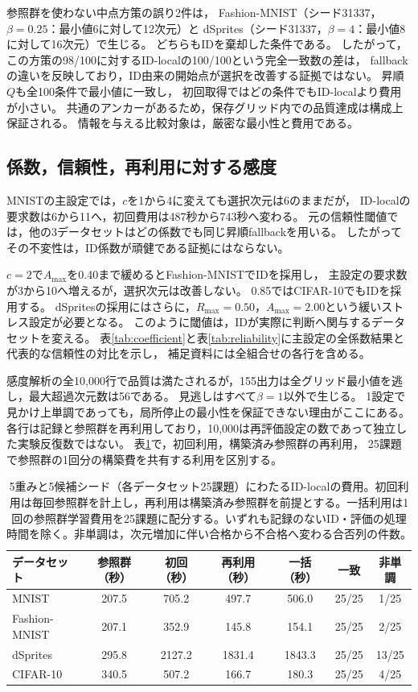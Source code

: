 \documentclass[11pt,a4paper]{ltjsarticle}
\begin{document}
参照群を使わない中点方策の誤り2件は，
Fashion-MNIST（シード31337，$\beta=0.25$：最小値6に対して12次元）と
dSprites（シード31337，$\beta=4$：最小値8に対して16次元）で生じる。
どちらもIDを棄却した条件である。
したがって，この方策の98/100に対するID-localの100/100という完全一致数の差は，
fallbackの違いを反映しており，ID由来の開始点が選択を改善する証拠ではない。
昇順$Q$も全100条件で最小値に一致し，
初回取得ではどの条件でもID-localより費用が小さい。
共通のアンカーがあるため，保存グリッド内での品質達成は構成上保証される。
情報を与える比較対象は，厳密な最小性と費用である。

\subsection{係数，信頼性，再利用に対する感度}\label{sec:idsensitivity}
MNISTの主設定では，$c$を1から4に変えても選択次元は6のままだが，
ID-localの要求数は6から11へ，初回費用は487秒から743秒へ変わる。
元の信頼性閾値では，他の3データセットはどの係数でも同じ昇順fallbackを用いる。
したがってその不変性は，ID係数が頑健である証拠にはならない。

$c=2$で$A_{\max}$を0.40まで緩めるとFashion-MNISTでIDを採用し，
主設定の要求数が3から10へ増えるが，選択次元は改善しない。
0.85ではCIFAR-10でもIDを採用する。
dSpritesの採用にはさらに，$R_{\max}=0.50$，$A_{\max}=2.00$という緩いストレス設定が必要となる。
このように閾値は，IDが実際に判断へ関与するデータセットを変える。
表\ref{tab:coefficient}と表\ref{tab:reliability}に主設定の全係数結果と代表的な信頼性の対比を示し，
補足資料には全組合せの各行を含める。

感度解析の全10,000行で品質は満たされるが，155出力は全グリッド最小値を逃し，最大超過次元数は56である。
見逃しはすべて$\beta=1$以外で生じる。
1設定で見かけ上単調であっても，局所停止の最小性を保証できない理由がここにある。
各行は記録と参照群を再利用しており，10,000は再評価設定の数であって独立した実験反復数ではない。
表\ref{tab:amortization}で，初回利用，構築済み参照群の再利用，
25課題で参照群の1回分の構築費を共有する利用を区別する。
\begin{table}[H]
\caption{5重みと5候補シード（各データセット25課題）にわたるID-localの費用。初回利用は毎回参照群を計上し，再利用は構築済み参照群を前提とする。一括利用は1回の参照群学習費用を25課題に配分する。いずれも記録のないID・評価の処理時間を除く。非単調は，次元増加に伴い合格から不合格へ変わる合否列の件数。}\label{tab:amortization}
\small
\setlength{\tabcolsep}{3pt}
\begin{tabular*}{\textwidth}{@{\extracolsep{\fill}}lcccccc@{}}
\toprule
データセット & 参照群（秒） & 初回（秒） & 再利用（秒） & 一括（秒） & 一致 & 非単調 \\
\midrule
MNIST & 207.5 & 705.2 & 497.7 & 506.0 & 25/25 & 1/25 \\
Fashion-MNIST & 207.1 & 352.9 & 145.8 & 154.1 & 25/25 & 2/25 \\
dSprites & 295.8 & 2127.2 & 1831.4 & 1843.3 & 25/25 & 13/25 \\
CIFAR-10 & 340.5 & 507.2 & 166.7 & 180.3 & 25/25 & 4/25 \\
\bottomrule\end{tabular*}
\end{table}
\end{document}
